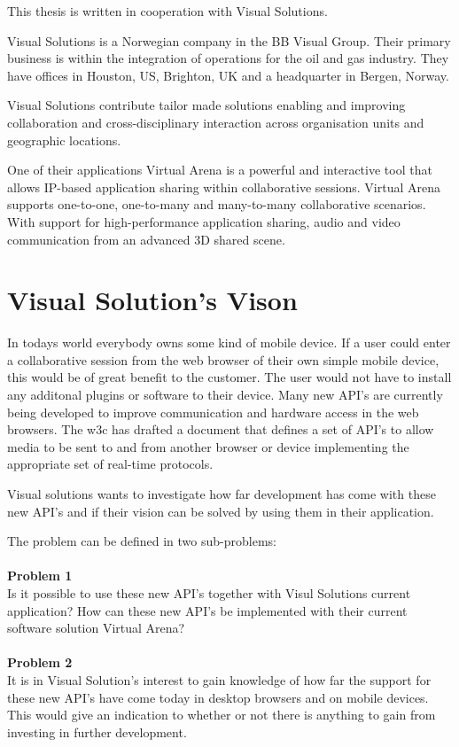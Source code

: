 
This thesis is written in cooperation with Visual Solutions.

Visual Solutions is a Norwegian company in the BB Visual Group. Their primary business is within the integration of operations for the oil and gas industry. They have offices in Houston, US, Brighton, UK and a headquarter in Bergen, Norway.

Visual Solutions contribute tailor made solutions enabling and improving collaboration and cross-disciplinary interaction across organisation units and geographic locations.

One of their applications Virtual Arena is a powerful and interactive tool that allows IP-based application sharing within collaborative sessions. Virtual Arena supports one-to-one, one-to-many and many-to-many collaborative scenarios. With support for high-performance application sharing, audio and video communication from an advanced 3D shared scene.

\section{Visual Solution's Vison}
In todays world everybody owns some kind of mobile device. If a user could enter a collaborative session from the web browser of their own simple mobile device, this would be of great benefit to the customer. The user would not have to install any additonal plugins or software to their device. Many new API's are currently being developed to improve communication and hardware access in the web browsers. The \gls{w3c} has drafted a document that defines a set of API's to allow media to be sent to and from another browser or device implementing the appropriate set of real-time protocols.

Visual solutions wants to investigate how far development has come with these new API's and if their vision can be solved by using them in their application.

The problem can be defined in two sub-problems:
\\
\\
\textbf{Problem 1}\\
Is it possible to use these new API's together with Visul Solutions current application? How can these new API's be implemented with their current software solution Virtual Arena?
\\
\\
\textbf{Problem 2}\\
It is in Visual Solution's interest to gain knowledge of how far the support for these new API's have come today in desktop browsers and on mobile devices. This would give an indication to whether or not there is anything to gain from investing in further development.